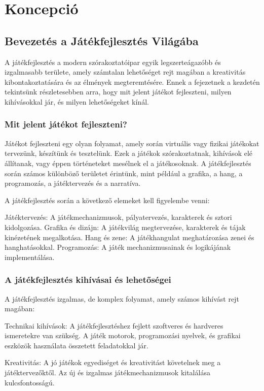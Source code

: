 \chapter{Koncepció}

\section{Bevezetés a Játékfejlesztés Világába}

A játékfejlesztés a modern szórakoztatóipar egyik legszerteágazóbb és izgalmasabb területe, amely számtalan lehetőséget rejt magában a kreativitás kibontakoztatására és az élmények megteremtésére. Ennek a fejezetnek a kezdetén tekintsünk részletesebben arra, hogy mit jelent játékot fejleszteni, milyen kihívásokkal jár, és milyen lehetőségeket kínál.

\subsection{Mit jelent játékot fejleszteni?}
Játékot fejleszteni egy olyan folyamat, amely során virtuális vagy fizikai játékokat tervezünk, készítünk és tesztelünk. Ezek a játékok szórakoztatnak, kihívások elé állítanak, vagy éppen történeteket mesélnek el a játékosoknak. A játékfejlesztés során számos különböző területet érintünk, mint például a grafika, a hang, a programozás, a játéktervezés és a narratíva.

A játékfejlesztés során a következő elemeket kell figyelembe venni:

Játéktervezés: A játékmechanizmusok, pályatervezés, karakterek és sztori kidolgozása.
Grafika és dizájn: A játékvilág megtervezése, karakterek és tájak kinézetének megalkotása.
Hang és zene: A játékhangulat meghatározása zenei és hanghatásokkal.
Programozás: A játék mechanizmusainak és logikájának implementálása.
\subsection{A játékfejlesztés kihívásai és lehetőségei}
A játékfejlesztés izgalmas, de komplex folyamat, amely számos kihívást rejt magában:

Technikai kihívások: A játékfejlesztéshez fejlett szoftveres és hardveres ismeretekre van szükség. A játék motorok, programozási nyelvek, és grafikai eszközök használata összetett feladatokkal jár.

Kreativitás: A jó játékok egyediséget és kreativitást követelnek meg a játéktervezőktől. Az új és izgalmas játékmechanizmusok kitalálása kulcsfontosságú.

